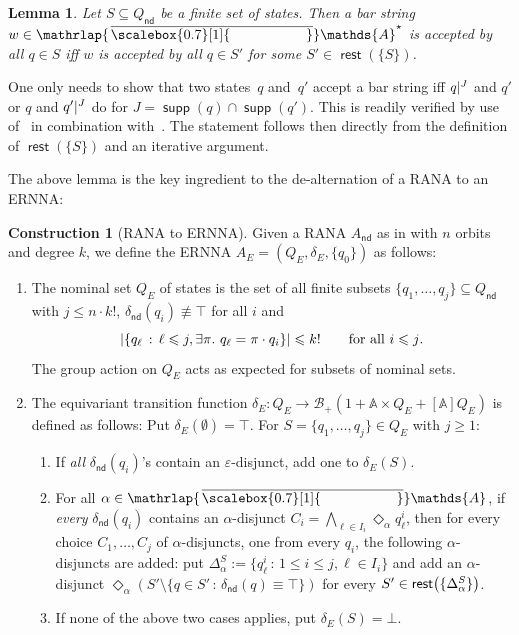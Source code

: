 \documentclass[10pt,a4paper]{amsart}
\newtheorem{lem}[theo]{Lemma}
\theoremstyle{definition}
\newtheorem{construction}[theo]{Construction}
\newcommand\restr[2]{{%
  \left.\kern-\nulldelimiterspace %
  #1 %
  \littletaller %
  \right|{}^{#2} %
}}
\newcommand{\littletaller}{\mathchoice{\vphantom{\big|}}{}{}{}}
\newcommand{\seq}{\subseteq}
\newcommand{\At}{\mathds{A}}
\newcommand{\barAs}{\barNames^{\star}}
\newcommand{\op}[1]{\operatorname{\mathsf{#1}}}
\newcommand{\nd}{\op{nd}}
\newcommand{\rest}{\op{rest}}
\newcommand{\card}[1]{\left\vert#1\right\vert}
\newcommand{\allbool}{\mathcal{B}}
\newcommand{\posbool}{\allbool_+}
\DeclareMathOperator{\supp}{\mathsf{supp}}
\newcommand{\names}{\At}
\newcommand{\Abstr}[2][\names]{[#1]#2}
\newcommand{\set}[1]{\{#1\}}
\newcommand{\setw}[2]{\{#1\,:\,#2\}}
\newcommand{\mybar}[3]{%
  \mathrlap{\hspace{#2}\overline{\scalebox{#1}[1]{\phantom{\ensuremath{#3}}}}}\ensuremath{#3}
}
\newcommand{\barNames}{{\mybar{0.7}{1.25pt}{\names}}}
\let\originalleft\left
\let\originalright\right
\renewcommand{\left}{\mathopen{}\mathclose\bgroup\originalleft}
\renewcommand{\right}{\aftergroup\egroup\originalright}
\begin{document}
\begin{lem}\label{lem:correst}
  Let $S \seq Q_{\nd}$ be a finite set of states. Then a bar string $w \in \barAs$
  is accepted by \emph{all} $q \in S$ iff $w$ is accepted by \emph{all} $q \in S'$
  for some $S' \in \rest(\{S\})$.
\end{lem}
\begin{IEEEproof}
  One only needs to show that two states~$q$ and~$q'$ accept a bar string iff $\restr{q}{J}$
  and $q'$ or $q$ and $\restr{q'}{J}$ do for $J = \supp(q) \cap \supp(q')$. This
  is readily verified by use of~ in combination with~. The
  statement follows then directly from the definition of $\rest(\{S\})$ and an iterative
  argument.
\end{IEEEproof}
The above lemma is the key ingredient to the de-alternation of a RANA to an  ERNNA:

\begin{construction}[RANA to ERNNA]\label{constr:dealt}
  Given a RANA $A_{\nd}$ as in 
  with $n$ orbits and degree $k$, we define the ERNNA $A_E=(Q_E,\delta_E,\{q_0\})$ as follows:
  \begin{enumerate}
    \item The nominal set $Q_E$ of states is the set of all finite subsets 
    $\{q_1,\ldots,q_j\}\seq Q_{\nd}$ with $j \leqslant n \cdot k!$, $\delta_{\nd}(q_i) \not\equiv \top$
    for all $i$ and
    \[ 
      \card{\setw{q_\ell}{\ell \leqslant j, \exists \pi.\ q_\ell = \pi \cdot q_i}} \leqslant k!
      \qquad\text{for all $i \leqslant j$}.
    \]
    The
      group action on $Q_E$ acts as expected for subsets of nominal sets.
    \item The equivariant transition function $\delta_E \colon Q_E \to \posbool(1 + \names \times Q_E + \Abstr{Q_E})$ is defined
      as follows: Put $\delta_E(\emptyset) = \top$.
      For $S = \set{q_1, \dots, q_j} \in Q_E$ with $j \geqslant 1$:
      \begin{enumerate}
        \item If \emph{all} $\delta_{\nd}(q_i)$'s contain an $\varepsilon$-disjunct, add one to
          $\delta_E(S)$. %
        \item For all $\alpha \in \barNames$, if \emph{every} $\delta_{\nd}(q_i)$ contains an $\alpha$-disjunct $C_i = \bigwedge_{\ell \in I_i} \Diamond_{\alpha} q^i_\ell$, then for every choice $C_1, \ldots, C_j$ of $\alpha$-disjuncts, one from every $q_i$, the following $\alpha$-disjuncts are added:
          put \(\Delta_\alpha^S := \setw{q^i_\ell}{1 \leqslant i \leqslant j, \ell \in I_i}\) and add an $\alpha$-disjunct $\Diamond_{\alpha} (S' \setminus \setw{q \in S'}{\delta_{\nd}(q) \equiv \top})$ for every $S' \in \rest\left(\set{\Delta_\alpha^S}\right)$.
        \item If none of the above two cases applies, put $\delta_E(S) = \bot$.
      \end{enumerate}
  \end{enumerate}
\end{construction}
\end{document}
